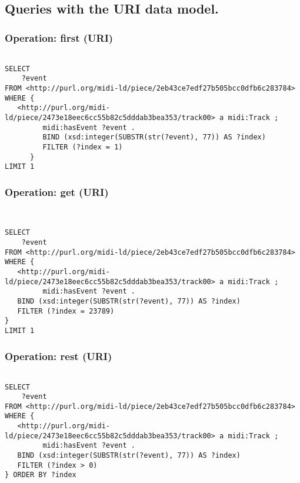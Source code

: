 \subsection{Queries with the URI data model.}
\label{queries:URI}

\subsubsection{Operation: first (URI)}
\label{query:URI:first}

\begin{lstlisting}[language=sparql]

SELECT
	?event
FROM <http://purl.org/midi-ld/piece/2eb43ce7edf27b505bcc0dfb6c283784>
WHERE {
   <http://purl.org/midi-ld/piece/2473e18eec6cc55b82c5dddab3bea353/track00> a midi:Track ;
         midi:hasEvent ?event .
	     BIND (xsd:integer(SUBSTR(str(?event), 77)) AS ?index)
		 FILTER (?index = 1)
	  } 
LIMIT 1

\end{lstlisting}

\subsubsection{Operation: get (URI)}
\label{query:URI:get}

\begin{lstlisting}[language=sparql]


SELECT
	?event
FROM <http://purl.org/midi-ld/piece/2eb43ce7edf27b505bcc0dfb6c283784>
WHERE {
   <http://purl.org/midi-ld/piece/2473e18eec6cc55b82c5dddab3bea353/track00> a midi:Track ;
         midi:hasEvent ?event .
   BIND (xsd:integer(SUBSTR(str(?event), 77)) AS ?index)
   FILTER (?index = 23789)
} 
LIMIT 1

\end{lstlisting}

\subsubsection{Operation: rest (URI)}
\label{query:URI:rest}

\begin{lstlisting}[language=sparql]

SELECT
	?event
FROM <http://purl.org/midi-ld/piece/2eb43ce7edf27b505bcc0dfb6c283784>
WHERE {
   <http://purl.org/midi-ld/piece/2473e18eec6cc55b82c5dddab3bea353/track00> a midi:Track ;
         midi:hasEvent ?event .
   BIND (xsd:integer(SUBSTR(str(?event), 77)) AS ?index)
   FILTER (?index > 0)
} ORDER BY ?index

\end{lstlisting}

